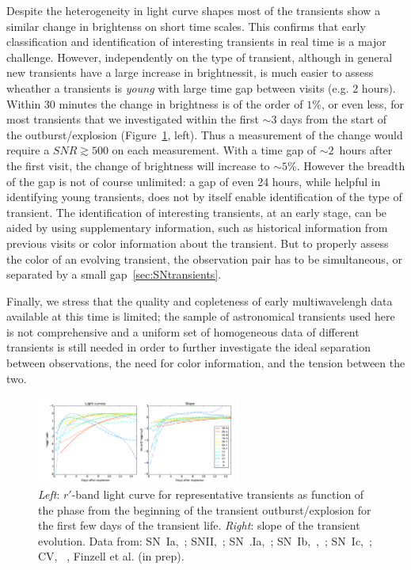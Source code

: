 Despite the heterogeneity in light curve shapes most of the transients show a similar change in brightenss on short time scales. 
This confirms that early classification and identification of interesting transients in real time is a major challenge. However, independently on the type of transient, although in general new transients have a large increase in brightnessit, is much easier to assess wheather a transients is \emph{young} with large time gap between visits (e.g. 2 hours).
Within 30 minutes the change in brightness is of the order of $1\%$, or even less, for most transients that we investigated within the first $\sim3$ days from the start of the outburst/explosion (Figure~\ref{fig:earlyslope}, left). Thus a measurement of the change would require a $SNR\gtrsim500$ on each measurement. With a time gap of $\sim2$~hours after the first visit, the change of brightness will increase to $\sim5\%$. However the breadth of the gap is not of course unlimited: a gap of even 24 hours, while helpful in identifying young transients, does not by itself enable identification of the type of transient.  The identification of interesting transients, at an early stage, can be aided by using supplementary information, such as historical information from previous visits or color information about the transient. But to properly assess the color of an evolving transient, the observation pair has to be simultaneous, or separated by a small gap~\ref{sec:SNtransients}.

Finally, we stress that the quality and copleteness of early multiwavelengh data available at this time is limited; the sample of astronomical transients used here is not comprehensive and a uniform set of homogeneous data of different transients is still needed in order to further investigate the ideal separation between observations, the need for color information, and the tension between the two. 

\begin{figure}[hbt]
\centerline{
\includegraphics[width=0.6\textwidth]{figs/transients/earlyslope.pdf}
}
\caption{\emph{Left}: $r'$-band light curve for representative transients as function of the phase from the beginning of the transient outburst/explosion for the first few days of the transient life. \emph{Right}: slope of the transient evolution. Data from: SN~Ia,~\citet{Olling15}; SNII,~\citet{Rubin16}; SN~.Ia,~\citet{Shen10}; SN~Ib,~\citet{Valenti11},~\citet{Cao13}; SN~Ic,~\citet{Mazzali02}; CV, ~\citet{Sokoloski13}, Finzell et al. (in prep).}
\label{fig:earlyslope}
\end{figure}

